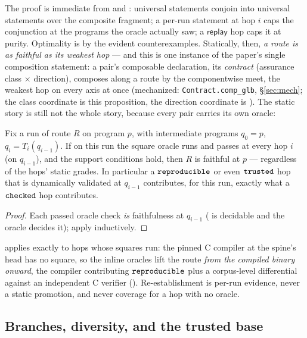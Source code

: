 The proof is immediate from  and :
universal statements conjoin into universal statements over the composite
fragment; a per-run statement at hop $i$ caps the conjunction at the
programs the oracle actually saw; a $\mathsf{replay}$ hop caps it at
purity. Optimality is by the evident counterexamples. Statically, then,
\emph{a route is as faithful as its weakest hop} --- and this is one
instance of the paper's single composition statement: a pair's
composable declaration, its \emph{contract} (assurance class $\times$
direction), composes along a route by the componentwise meet, the
weakest hop on every axis at once (mechanized:
\texttt{Contract.comp\_glb}, \S\ref{sec:mech}; the class coordinate is
this proposition, the direction coordinate is ). The
static story is still not the whole story, because every pair carries
its own oracle:

\begin{theorem}
\label{thm:reestablish}
Fix a run of route $R$ on program $p$, with intermediate programs
$q_0 = p$, $q_i = T_i(q_{i-1})$. If on this run the square oracle runs
and passes at every hop $i$ (on $q_{i-1}$), and the support conditions
hold, then $R$ is faithful at $p$ --- regardless of the hops' static
grades. In particular a $\mathtt{reproducible}$ or even $\mathtt{trusted}$ hop that is
dynamically validated at $q_{i-1}$ contributes, for this run, exactly
what a $\mathtt{checked}$ hop contributes.
\end{theorem}

\begin{proof}
Each passed oracle check \emph{is} faithfulness at $q_{i-1}$
( is decidable and the oracle decides it); apply
 inductively.
\end{proof}

 applies exactly to hops whose squares run: the
pinned C compiler at the spine's head has no square, so the inline
oracles lift the route \emph{from the compiled binary onward}, the
compiler contributing $\mathtt{reproducible}$ plus a corpus-level differential
against an independent C verifier ().
Re-establishment is per-run evidence, never a static promotion, and
never coverage for a hop with no oracle.

\subsection{Branches, diversity, and the trusted base}
\label{sec:branching}

